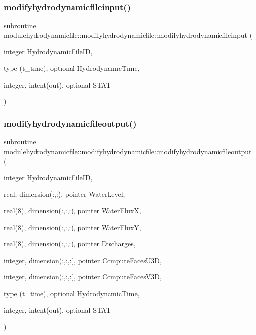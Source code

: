 \subsubsection{\texorpdfstring{modifyhydrodynamicfileinput()}{modifyhydrodynamicfileinput()}}
{\footnotesize\ttfamily subroutine modulehydrodynamicfile\+::modifyhydrodynamicfile\+::modifyhydrodynamicfileinput (\begin{DoxyParamCaption}\item[{integer}]{Hydrodynamic\+File\+ID,  }\item[{type (t\+\_\+time), optional}]{Hydrodynamic\+Time,  }\item[{integer, intent(out), optional}]{S\+T\+AT }\end{DoxyParamCaption})\hspace{0.3cm}{\ttfamily [private]}}

\mbox{\label{interfacemodulehydrodynamicfile_1_1modifyhydrodynamicfile_af4c11107bb73408b45614aa9a16648f5}} 
\subsubsection{\texorpdfstring{modifyhydrodynamicfileoutput()}{modifyhydrodynamicfileoutput()}}
{\footnotesize\ttfamily subroutine modulehydrodynamicfile\+::modifyhydrodynamicfile\+::modifyhydrodynamicfileoutput (\begin{DoxyParamCaption}\item[{integer}]{Hydrodynamic\+File\+ID,  }\item[{real, dimension(\+:,\+:), pointer}]{Water\+Level,  }\item[{real(8), dimension(\+:,\+:,\+:), pointer}]{Water\+FluxX,  }\item[{real(8), dimension(\+:,\+:,\+:), pointer}]{Water\+FluxY,  }\item[{real(8), dimension(\+:,\+:,\+:), pointer}]{Discharges,  }\item[{integer, dimension(\+:,\+:,\+:), pointer}]{Compute\+Faces\+U3D,  }\item[{integer, dimension(\+:,\+:,\+:), pointer}]{Compute\+Faces\+V3D,  }\item[{type (t\+\_\+time), optional}]{Hydrodynamic\+Time,  }\item[{integer, intent(out), optional}]{S\+T\+AT }\end{DoxyParamCaption})\hspace{0.3cm}{\ttfamily [private]}}




